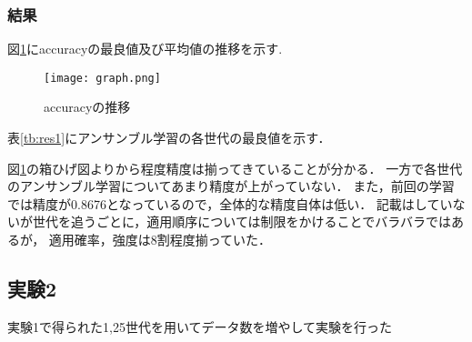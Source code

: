 \documentclass[twocolumn]{jarticle}     %
\begin{document}
\subsubsection{結果}
図\ref{fig:graph1}にaccuracyの最良値及び平均値の推移を示す.
\begin{figure}[hp]
	\centering
	\texttt{[image: graph.png]}
	\caption{accuracyの推移\label{fig:graph1}}
\end{figure}
表\ref{tb:res1}にアンサンブル学習の各世代の最良値を示す．
\begin{table}[h]
	\centering
	\caption{実験結果\label{tb:res1}}
\end{table}
図\ref{fig:graph1}の箱ひげ図よりから程度精度は揃ってきていることが分かる．
一方で各世代のアンサンブル学習についてあまり精度が上がっていない．
また，前回の学習では精度が0.8676となっているので，全体的な精度自体は低い．
記載はしていないが世代を追うごとに，適用順序については制限をかけることでバラバラではあるが，
適用確率，強度は8割程度揃っていた．

\subsection{実験2}
実験1で得られた1,25世代を用いてデータ数を増やして実験を行った
\end{document}

